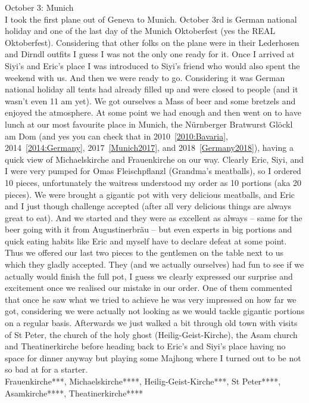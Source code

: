 October 3: Munich\\
I took the first plane out of Geneva to Munich. October 3rd is German national holiday and one of the last day of the Munich Oktoberfest (yes the REAL Oktoberfest). Considering that other folks on the plane were in their Lederhosen and Dirndl outfits I guess I was not the only one ready for it. Once I arrived at Siyi's and Eric's place I was introduced to Siyi's friend who would also spent the weekend with us. And then we were ready to go. Considering it was German national holiday all tents had already filled up and were closed to people (and it wasn't even 11 am yet). We got ourselves a Mass of beer and some bretzels and enjoyed the atmosphere. At some point we had enough and then went on to have lunch at our most favourite place in Munich, the N\"urnberger Bratwurst Gl\"ockl am Dom (and yes you can check that in 2010~\ref{2010:Bavaria}, 2014~\ref{2014:Germany}, 2017~\ref{Munich2017}, and 2018~\ref{Germany2018}), having a quick view of Michaelskirche and Frauenkirche on our way. Clearly Eric, Siyi, and I were very pumped for Omas Fleischpflanzl (Grandma's meatballs), so I ordered 10 pieces, unfortunately the waitress understood my order as 10 portions (aka 20 pieces). We were brought a gigantic pot with very delicious meatballs, and Eric and I just though challenge accepted (after all very delicious things are always great to eat). And we started and they were as excellent as always -- same for the beer going with it from Augustinerbr\"au -- but even experts in big portions and quick eating habits like Eric and myself have to declare defeat at some point. Thus we offered our last two pieces to the gentlemen on the table next to us which they gladly accepted. They (and we actually ourselves) had fun to see if we actually would finish the full pot, I guess we clearly expressed our surprise and excitement once we realised our mistake in our order. One of them commented that once he saw what we tried to achieve he was very impressed on how far we got, considering we were actually not looking as we would tackle gigantic portions on a regular basis. Afterwards we just walked a bit through old town with visits of St Peter, the church of the holy ghost (Heilig-Geist-Kirche), the Asam church and Theatinerkirche before heading back to Eric's and Siyi's place having no space for dinner anyway but playing some Majhong where I turned out to be not so bad at for a starter.\\

Frauenkirche***, Michaelskirche****, Heilig-Geist-Kirche***, St Peter****, Asamkirche****, Theatinerkirche****\\

